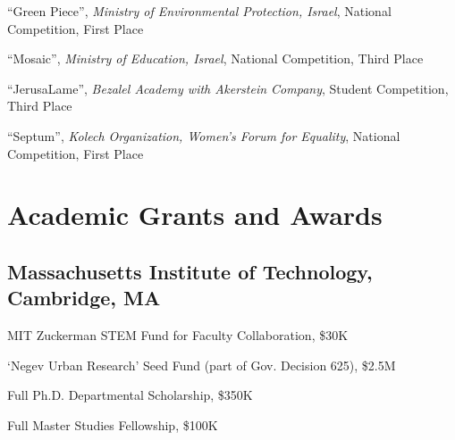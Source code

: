 \begin{tablist}
    \item[2007]\tab \enquote{Green Piece},
    \textit{Ministry of Environmental Protection, Israel},
    National Competition,
    First Place

    \item[2006]\tab \enquote{Mosaic},
    \textit{Ministry of Education, Israel},
    National Competition,
    Third Place

    \item[2006]\tab \enquote{JerusaLame},
    \textit{Bezalel Academy with Akerstein Company},
    Student Competition,
    Third Place

    \item[2005]\tab \enquote{Septum},
    \textit{Kolech Organization, Women's Forum for Equality},
    National Competition,
    First Place

\end{tablist}


\section*{Academic Grants and Awards}

\subsection*{Massachusetts Institute of Technology, Cambridge, MA}
\begin{tablist}
    \item[2023] \tab MIT Zuckerman STEM Fund for Faculty Collaboration, \$30K
    \item[2022] \tab `Negev Urban Research' Seed Fund (part of Gov. Decision 625), \$2.5M
    \item[2017] \tab Full Ph.D. Departmental Scholarship, \$350K
    \item[2013] \tab Full Master Studies Fellowship, \$100K
\end{tablist}

